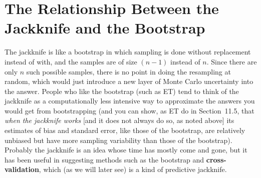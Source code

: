 \documentclass[11pt]{article}
\begin{document}
\section*{The Relationship Between the Jackknife and the Bootstrap}

The jackknife is like a bootstrap in which sampling is done without
replacement instead of with, and the samples are of size $(n - 1)$
instead of $n$. Since there are only $n$ such possible samples, there is
no point in doing the resampling at random, which would just introduce a
new layer of Monte Carlo uncertainty into the answer. People who like
the bootstrap (such as ET) tend to think of the jackknife as a
computationally less intensive way to approximate the answers you would
get from bootstrapping (and you can show, as ET do in Section~11.5, that
{\it when the jackknife works\/} [and it does not always do so, as noted
above] its estimates of bias and standard error, like those of the
bootstrap, are relatively unbiased but have more sampling variability
than those of the bootstrap). Probably the jackknife is an idea whose
time has mostly come and gone, but it has been useful in suggesting
methods such as the bootstrap and {\bf cross-validation}, which (as we
will later see) is a kind of predictive jackknife.
\end{document}
